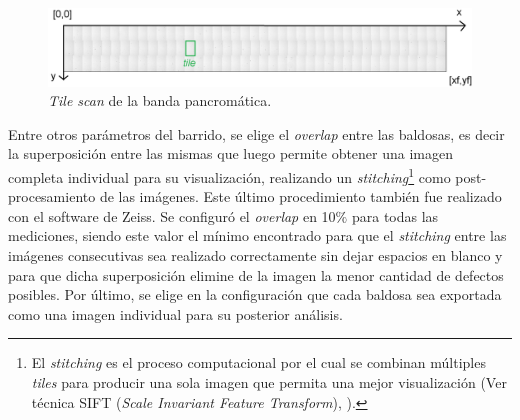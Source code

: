 \begin{figure}[H]
	\centering
	\includegraphics[width=1.0\textwidth]{Figs/cuantificaciondefectos/tilescan.png}
	\caption{\textit{Tile scan} de la banda pancromática.}
	\label{fig:tilescan}
\end{figure} 

Entre otros parámetros del barrido, se elige el \textit{overlap} entre las baldosas, es decir la superposición entre las mismas que luego permite obtener una imagen completa individual para su visualización,  realizando un \textit{stitching}\footnote{El \textit{stitching} es el proceso computacional por el cual se combinan múltiples \textit{tiles} para
producir una sola imagen que permita una mejor visualización (Ver técnica SIFT (\textit{Scale Invariant Feature Transform}), \cite{Lowe}).} como post-procesamiento de las imágenes. Este último procedimiento también fue realizado con el software de Zeiss. Se configuró el \textit{overlap} en 10$\%$ para todas las mediciones, siendo este valor el mínimo encontrado para que el \textit{stitching} entre las imágenes consecutivas sea realizado correctamente sin dejar espacios en blanco y para que dicha superposición elimine de la imagen la menor cantidad de defectos posibles. Por último, se elige en la configuración que cada baldosa sea exportada como una imagen individual para su posterior análisis.


